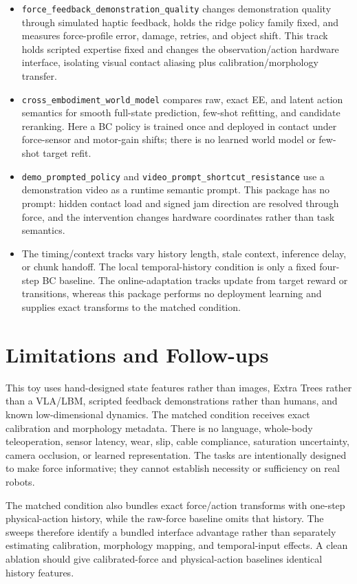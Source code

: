 \documentclass[11pt]{article}
\begin{document}
\begin{itemize}[leftmargin=1.5em]
  \item \texttt{force\_feedback\_demonstration\_quality} changes demonstration quality through simulated haptic feedback, holds the ridge policy family fixed, and measures force-profile error, damage, retries, and object shift. This track holds scripted expertise fixed and changes the observation/action hardware interface, isolating visual contact aliasing plus calibration/morphology transfer.
  \item \texttt{cross\_embodiment\_world\_model} compares raw, exact EE, and latent action semantics for smooth full-state prediction, few-shot refitting, and candidate reranking. Here a BC policy is trained once and deployed in contact under force-sensor and motor-gain shifts; there is no learned world model or few-shot target refit.
  \item \texttt{demo\_prompted\_policy} and \texttt{video\_prompt\_shortcut\_resistance} use a demonstration video as a runtime semantic prompt. This package has no prompt: hidden contact load and signed jam direction are resolved through force, and the intervention changes hardware coordinates rather than task semantics.
  \item The timing/context tracks vary history length, stale context, inference delay, or chunk handoff. The local temporal-history condition is only a fixed four-step BC baseline. The online-adaptation tracks update from target reward or transitions, whereas this package performs no deployment learning and supplies exact transforms to the matched condition.
\end{itemize}

\section{Limitations and Follow-ups}

This toy uses hand-designed state features rather than images, Extra Trees rather than a VLA/LBM, scripted feedback demonstrations rather than humans, and known low-dimensional dynamics. The matched condition receives exact calibration and morphology metadata. There is no language, whole-body teleoperation, sensor latency, wear, slip, cable compliance, saturation uncertainty, camera occlusion, or learned representation. The tasks are intentionally designed to make force informative; they cannot establish necessity or sufficiency on real robots.

The matched condition also bundles exact force/action transforms with one-step physical-action history, while the raw-force baseline omits that history. The sweeps therefore identify a bundled interface advantage rather than separately estimating calibration, morphology mapping, and temporal-input effects. A clean ablation should give calibrated-force and physical-action baselines identical history features.
\end{document}
